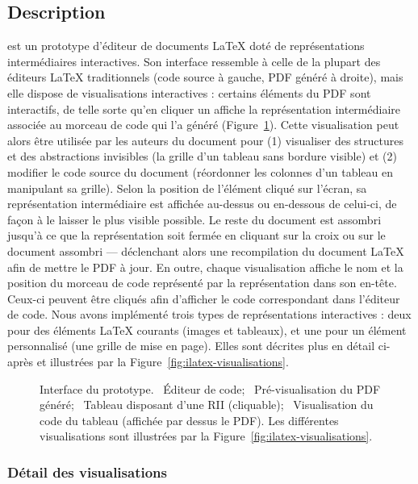 \subsection{Description}
\iLaTeX{} est un prototype d'éditeur de documents \LaTeX{} doté de représentations intermédiaires interactives.
Son interface ressemble à celle de la plupart des éditeurs \LaTeX{} traditionnels (code source à gauche, PDF généré à droite), mais elle dispose de visualisations interactives : certains éléments du PDF sont interactifs, de telle sorte qu'en cliquer un affiche la représentation intermédiaire associée au morceau de code qui l'a généré (Figure~\ref{fig:ilatex-interface}).
Cette visualisation peut alors être utilisée par les auteurs du document pour (1) visualiser des structures et des abstractions invisibles (\eg la grille d'un tableau sans bordure visible) et (2) modifier le code source du document (\eg réordonner les colonnes d'un tableau en manipulant sa grille).
Selon la position de l'élément cliqué sur l'écran, sa représentation intermédiaire est affichée au-dessus ou en-dessous de celui-ci, de façon à le laisser le plus visible possible.
Le reste du document est assombri jusqu'à ce que la représentation soit fermée en cliquant sur la croix ou sur le document assombri --- déclenchant alors une recompilation du document \LaTeX{} afin de mettre le PDF à jour.
En outre, chaque visualisation affiche le nom et la position du morceau de code représenté par la représentation dans son en-tête. Ceux-ci peuvent être cliqués afin d'afficher le code correspondant dans l'éditeur de code.
Nous avons implémenté trois types de représentations interactives : deux pour des éléments \LaTeX{} courants (images et tableaux), et une pour un élément personnalisé (une grille de mise en page).
Elles sont décrites plus en détail ci-après et illustrées par la Figure~\ref{fig:ilatex-visualisations}.

\begin{figure}[h]
  \centering
  \caption{Interface du prototype. ~Éditeur de code; ~Pré-visualisation du PDF généré; ~Tableau disposant d'une RII (cliquable); ~Visualisation du code du tableau (affichée par dessus le PDF). Les différentes visualisations sont illustrées par la Figure~\ref{fig:ilatex-visualisations}.}
  \label{fig:ilatex-interface}
\end{figure}

\subsubsection{Détail des visualisations}

